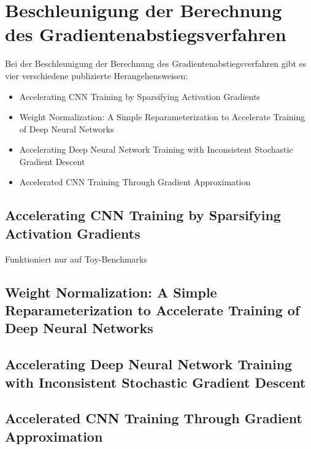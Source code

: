 \section{Beschleunigung der Berechnung des Gradientenabstiegsverfahren}
Bei der Beschleunigung der Berechnung des Gradientenabstiegsverfahren gibt es vier verschiedene publizierte Herangehensweisen:
\begin{itemize}
 \item Accelerating CNN Training by Sparsifying Activation Gradients
 \item Weight Normalization: A Simple Reparameterization
to Accelerate Training of Deep Neural Networks
 \item Accelerating Deep Neural Network Training with Inconsistent Stochastic Gradient Descent
 \item Accelerated CNN Training Through Gradient Approximation 
\end{itemize}


\subsection{Accelerating CNN Training by Sparsifying Activation Gradients}

Funktioniert nur auf Toy-Benchmarks


\subsection{Weight Normalization: A Simple Reparameterization
to Accelerate Training of Deep Neural Networks}





\subsection{Accelerating Deep Neural Network Training with Inconsistent Stochastic Gradient Descent}




\subsection{Accelerated CNN Training Through Gradient Approximation }
